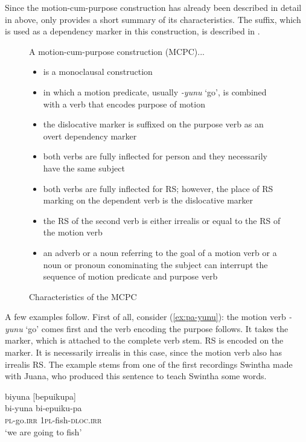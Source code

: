 Since the motion-cum-purpose construction has already been described in detail in  above,  only provides a short summary of its characteristics. The  suffix, which is used as a dependency marker in this construction, is described in .

\begin{figure}[!ht]
%
%
A motion-cum-purpose construction (MCPC)... 
\begin{itemize}
\item is a monoclausal construction
\item in which a motion predicate, usually \textit{-yunu} ‘go’, is combined with a verb that encodes purpose of motion
\item the dislocative marker is suffixed on the purpose verb as an overt dependency marker
\item both verbs are fully inflected for person and they necessarily have the same subject
\item both verbs are fully inflected for RS; however, the place of RS marking on the dependent verb is the dislocative marker
\item the RS of the second verb is either irrealis or equal to the RS of the motion verb 
\item an adverb or a noun referring to the goal of a motion verb or a noun or pronoun conominating the subject can interrupt the sequence of motion predicate and purpose verb
\end{itemize}
\caption{Characteristics of the MCPC}
%
\label{fig:MCPC}
\end{figure}



A few examples follow. First of all, consider (\ref{ex:pa-yunu}): the motion verb \textit{-yunu} ‘go’ comes first and the verb encoding the purpose follows. It takes the  marker, which is attached to the complete verb stem. RS is encoded on the  marker. It is necessarily irrealis in this case, since the motion verb also has irrealis RS. The example stems from one of the first recordings Swintha made with Juana, who produced this sentence to teach Swintha some words.

\ea\label{ex:pa-yunu}
\begingl 
\glpreamble biyuna \textup{[}bepuikupa\textup{]}\\
\gla bi-yuna bi-epuiku-pa\\ 
\textsc{pl}-go.\textsc{irr} 1\textsc{pl}-fish-\textsc{dloc.irr}\\ 
\glft ‘we are going to fish’\\ 
\endgl
\trailingcitation{[jxx-e081025s-1.158]}
\xe


